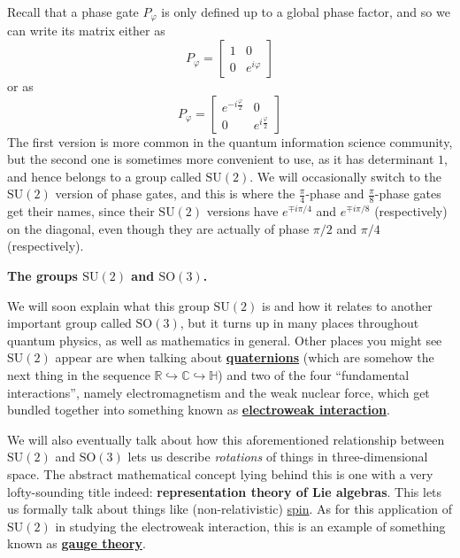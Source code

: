 \documentclass[fleqn,a4paper]{article}
\newenvironment{technical}[1]{\textbf{#1.}\par\vspace{.5\baselineskip}\everypar{\setlength{\parindent}{1.5em}}}{}
\theoremstyle{definition}
\theoremstyle{definition}
\theoremstyle{definition}
\theoremstyle{definition}
\theoremstyle{remark}
\begin{document}
Recall that a phase gate \(P_\varphi\) is only defined up to a global phase factor, and so we can write its matrix either as
\[
  P_\varphi =
  \begin{bmatrix}
    1 & 0
  \\0 & e^{i\varphi}
  \end{bmatrix}
\]
or as
\[
  P_\varphi =
  \begin{bmatrix}
    e^{-i\frac{\varphi}{2}} & 0
  \\0 & e^{i\frac{\varphi}{2}}
  \end{bmatrix}
\]
The first version is more common in the quantum information science community, but the second one is sometimes more convenient to use, as it has determinant \(1\), and hence belongs to a group called \(\mathrm{SU}(2)\).
We will occasionally switch to the \(\mathrm{SU}(2)\) version of phase gates, and this is where the \(\frac{\pi}{4}\)-phase and \(\frac{\pi}{8}\)-phase gates get their names, since their \(\mathrm{SU}(2)\) versions have \(e^{\mp i\pi/4}\) and \(e^{\mp i\pi/8}\) (respectively) on the diagonal, even though they are actually of phase \(\pi/2\) and \(\pi/4\) (respectively).

\begin{technical}{The groups $\mathrm{SU}(2)$ and $\mathrm{SO}(3)$}
We will soon explain what this group \(\mathrm{SU}(2)\) is and how it relates to another important group called \(\mathrm{SO}(3)\), but it turns up in many places throughout quantum physics, as well as mathematics in general.
Other places you might see \(\mathrm{SU}(2)\) appear are when talking about \href{https://en.wikipedia.org/wiki/Quaternion}{\textbf{quaternions}} (which are somehow the next thing in the sequence \(\mathbb{R}\hookrightarrow\mathbb{C}\hookrightarrow\mathbb{H}\)) and two of the four ``fundamental interactions'', namely electromagnetism and the weak nuclear force, which get bundled together into something known as \href{https://en.wikipedia.org/wiki/Electroweak_interaction}{\textbf{electroweak interaction}}.

We will also eventually talk about how this aforementioned relationship between \(\mathrm{SU}(2)\) and \(\mathrm{SO}(3)\) lets us describe \emph{rotations} of things in three-dimensional space.
The abstract mathematical concept lying behind this is one with a very lofty-sounding title indeed: \textbf{representation theory of Lie algebras}.
This lets us formally talk about things like (non-relativistic) \href{https://en.wikipedia.org/wiki/Spin_(physics)}{spin}.
As for this application of \(\mathrm{SU}(2)\) in studying the electroweak interaction, this is an example of something known as \href{https://en.wikipedia.org/wiki/Gauge_theory}{\textbf{gauge theory}}.

\end{technical}
\end{document}

